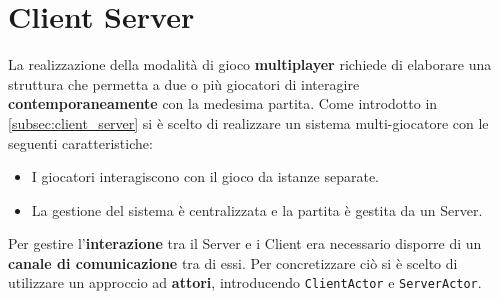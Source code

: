 \section{Client Server}
\label{sec:client_server_design}
La realizzazione della modalità di gioco \textbf{multiplayer} richiede di elaborare una struttura che permetta a due o più giocatori di interagire \textbf{contemporaneamente} con la medesima partita. Come introdotto in \ref{subsec:client_server} si è scelto di realizzare un sistema multi-giocatore con le seguenti caratteristiche:
\begin{itemize}
    \item I giocatori interagiscono con il gioco da istanze separate.
    \item La gestione del sistema è centralizzata e la partita è gestita da un Server.
\end{itemize}

Per gestire l'\textbf{interazione} tra il Server e i Client era necessario disporre di un \textbf{canale di comunicazione} tra di essi. Per concretizzare ciò si è scelto di utilizzare un approccio ad \textbf{attori}, introducendo \texttt{ClientActor} e \texttt{ServerActor}.


